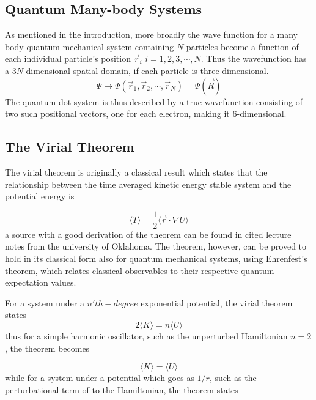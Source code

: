 \documentclass[aip,nobalancelastpage,
twocolumn,
rsi,%
 amsmath,amssymb,
 reprint,%
]{revtex4}
\begin{document}
\subsection{Quantum Many-body Systems }
As mentioned in the introduction, more broadly the wave function for a many body quantum mechanical system containing $N$ particles become a function of each individual particle's position $\vec{r}_i$ $i=1,2,3,\cdots, N$. Thus the wavefunction has a $3N$ dimensional spatial domain, if each particle is three dimensional. 
\begin{equation}
\Psi \rightarrow \Psi(\vec{r}_1,\vec{r}_2,\cdots, \vec{r}_N)=\Psi(\vec{R})
\end{equation}
The quantum dot system is thus described by a true wavefunction consisting of two such positional vectors, one for each electron, making it 6-dimensional.

\subsection{\label{sec:TheoryVirial }The Virial Theorem}
The virial theorem is originally a classical result which states that the relationship between the time averaged kinetic energy stable system and the potential energy is

\begin{equation}
\label{VirialTheorem}
\langle T \rangle = \frac{1}{2}\langle \vec{r} \cdot \nabla U\rangle
\end{equation}
a source with a good derivation of the theorem can be found in cited lecture notes from the university of Oklahoma\cite{VirialTheoremProof}.
The theorem, however, can be proved to hold in its classical form also for quantum mechanical systems, using Ehrenfest's theorem, which relates classical observables to their respective quantum expectation values.\par

For a system under a $n'th-degree$ exponential potential, the virial theorem states 
\begin{equation}
2\langle K \rangle = n\langle U\rangle
\end{equation}
thus for a simple harmonic oscillator, such as the unperturbed Hamiltonian $n=2$, the theorem becomes

\begin{equation}
\langle K \rangle = \langle U\rangle
\end{equation}
while for a system under a potential which goes as $1/r$, such as the perturbational term of to the Hamiltonian, the theorem states
\end{document}
